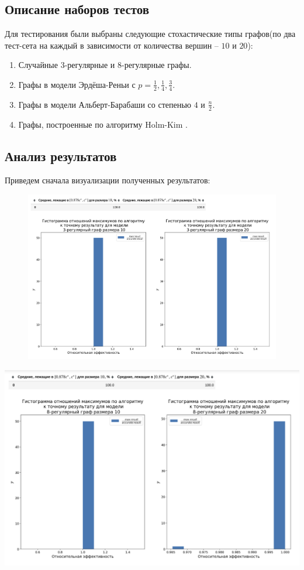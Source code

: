\documentclass[12pt, a4paper]{article}
\begin{document}
\subsection{Описание наборов тестов}

Для тестирования были выбраны следующие стохастические типы графов(по два тест-сета на каждый в зависимости от количества вершин -- $10$ и $20$):

\begin{enumerate}
    \item Случайные 3-регулярные и 8-регулярные графы.
    \item Графы в модели Эрдёша-Реньи с $p=\frac{1}{2}, \frac{1}{4}, \frac{3}{4}$.
    \item Графы в модели Альберт-Барабаши со степенью $4$ и $\frac{n}{2}$.
    \item Графы, построенные по алгоритму Holm-Kim \cite{Holm}.
\end{enumerate}

\subsection{Анализ результатов}
Приведем сначала визуализации полученных результатов:

\begin{figure}[h]
\centering
\includegraphics[width=1\textwidth]{images/1.png}
\caption[width=1\textwidth]{}
\label{fig:fig4}
\end{figure}

\includegraphics[width=1\textwidth]{images/2.png}
\end{document}
